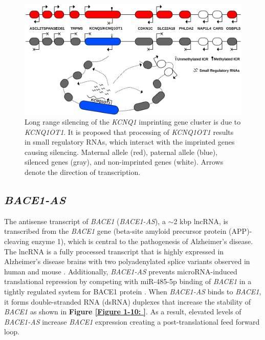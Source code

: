 {%
\begin{figure}[!ht]
\centering
\includegraphics[scale=0.44]{figures/KCNQ1OT1.pdf}
\caption{Long range silencing of the \emph{KCNQ1} imprinting gene cluster is due to \emph{KCNQ1OT1}. It is proposed that processing of \emph{KCNQ1OT1} results in small regulatory RNAs, which interact with the imprinted genes causing silencing. Maternal allele (red), paternal allele (blue), silenced genes (gray), and non-imprinted genes (white). Arrows denote the direction of transcription.}
\label{Figure 1-9: }
\end{figure}

\subsection{\textit{BACE1-AS}}

The antisense transcript of \textit{BACE1} (\textit{BACE1-AS}), a $\sim$2 kbp lncRNA, is transcribed from the \textit{BACE1} gene (beta-site amyloid precursor protein (APP)-cleaving enzyme 1), which is central to the pathogenesis of Alzheimer's disease. The lncRNA is a fully processed transcript that is highly expressed in Alzheimer's disease brains with two polyadenylated splice variants observed in human and mouse \cite{Faghihi2008}. Additionally, \textit{BACE1-AS} prevents microRNA-induced translational repression by competing with miR-485-5p binding of \textit{BACE1} in a tightly regulated system for BACE1 protein \cite{Faghihi2010}. When \textit{BACE1-AS} binds to \textit{BACE1}, it forms double-stranded RNA (dsRNA) duplexes that increase the stability of \textit{BACE1} as shown in \textbf{Figure \ref{Figure 1-10: }}. As a result, elevated levels of \textit{BACE1-AS} increase \textit{BACE1} expression creating a post-translational feed forward loop.

}
